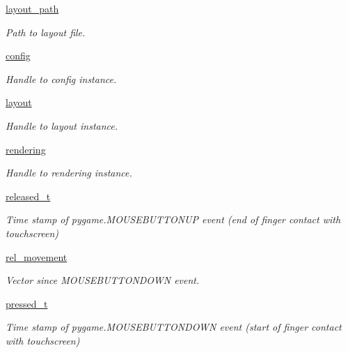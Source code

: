 \begin{DoxyCompactItemize}
\hyperlink{classocc_1_1open__cycling__computer_a49c34e270f0d29f25f8ddb6ca1ee5631}{layout\+\_\+path}
\begin{DoxyCompactList}\small\item\em Path to layout file. \end{DoxyCompactList}\item 
\hyperlink{classocc_1_1open__cycling__computer_a9fcf030e68a44147a38f34d214572f44}{config}
\begin{DoxyCompactList}\small\item\em Handle to config instance. \end{DoxyCompactList}\item 
\hyperlink{classocc_1_1open__cycling__computer_ac8c629c48b3fff8add28a1c7f7fc31ca}{layout}
\begin{DoxyCompactList}\small\item\em Handle to layout instance. \end{DoxyCompactList}\item 
\hyperlink{classocc_1_1open__cycling__computer_a05f815f6c23686c9a9a7728b3808fc99}{rendering}
\begin{DoxyCompactList}\small\item\em Handle to rendering instance. \end{DoxyCompactList}\item 
\hyperlink{classocc_1_1open__cycling__computer_a63a6b256728b0d8ced4fbace9f43791d}{released\+\_\+t}
\begin{DoxyCompactList}\small\item\em Time stamp of pygame.\+M\+O\+U\+S\+E\+B\+U\+T\+T\+O\+N\+UP event (end of finger contact with touchscreen) \end{DoxyCompactList}\item 
\hyperlink{classocc_1_1open__cycling__computer_a1bbc11b7dd1d16fadc63aa7b6360f71d}{rel\+\_\+movement}
\begin{DoxyCompactList}\small\item\em Vector since M\+O\+U\+S\+E\+B\+U\+T\+T\+O\+N\+D\+O\+WN event. \end{DoxyCompactList}\item 
\hyperlink{classocc_1_1open__cycling__computer_a1ea38b7c9655b557eacce7dc377a9ce6}{pressed\+\_\+t}
\begin{DoxyCompactList}\small\item\em Time stamp of pygame.\+M\+O\+U\+S\+E\+B\+U\+T\+T\+O\+N\+D\+O\+WN event (start of finger contact with touchscreen) \end{DoxyCompactList}\item 

\end{DoxyCompactItemize}
